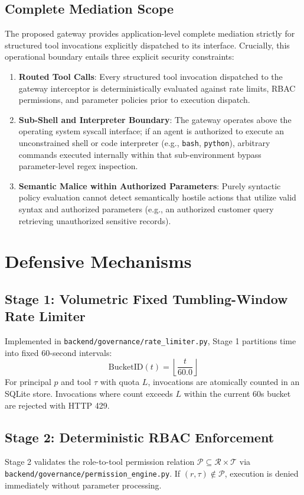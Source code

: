 \documentclass[10pt,twocolumn,letterpaper]{article}
\begin{document}
\subsection{Complete Mediation Scope}
The proposed gateway provides application-level complete mediation strictly for structured tool invocations explicitly dispatched to its interface. Crucially, this operational boundary entails three explicit security constraints:
\begin{enumerate}
    \item \textbf{Routed Tool Calls}: Every structured tool invocation dispatched to the gateway interceptor is deterministically evaluated against rate limits, RBAC permissions, and parameter policies prior to execution dispatch.
    \item \textbf{Sub-Shell and Interpreter Boundary}: The gateway operates above the operating system syscall interface; if an agent is authorized to execute an unconstrained shell or code interpreter (e.g., \texttt{bash}, \texttt{python}), arbitrary commands executed internally within that sub-environment bypass parameter-level regex inspection.
    \item \textbf{Semantic Malice within Authorized Parameters}: Purely syntactic policy evaluation cannot detect semantically hostile actions that utilize valid syntax and authorized parameters (e.g., an authorized customer query retrieving unauthorized sensitive records).
\end{enumerate}

\section{Defensive Mechanisms}

\subsection{Stage 1: Volumetric Fixed Tumbling-Window Rate Limiter}
Implemented in \texttt{backend/governance/rate\_limiter.py}, Stage 1 partitions time into fixed 60-second intervals:
\begin{equation}
\text{BucketID}(t) = \left\lfloor \frac{t}{60.0} \right\rfloor
\end{equation}
For principal $p$ and tool $\tau$ with quota $L$, invocations are atomically counted in an SQLite store. Invocations where count exceeds $L$ within the current 60s bucket are rejected with HTTP 429.

\subsection{Stage 2: Deterministic RBAC Enforcement}
Stage 2 validates the role-to-tool permission relation $\mathcal{P} \subseteq \mathcal{R} \times \mathcal{T}$ via \texttt{backend/governance/permission\_engine.py}. If $(r, \tau) \notin \mathcal{P}$, execution is denied immediately without parameter processing.
\end{document}
